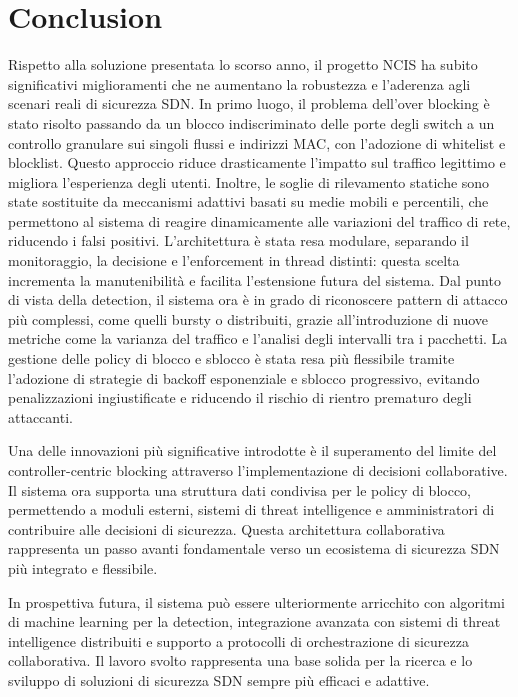 \chapter{Conclusion}
Rispetto alla soluzione presentata lo scorso anno, il progetto NCIS ha subito significativi miglioramenti che ne aumentano la robustezza e l'aderenza agli scenari reali di sicurezza SDN. In primo luogo, il problema dell'over blocking è stato risolto passando da un blocco indiscriminato delle porte degli switch a un controllo granulare sui singoli flussi e indirizzi MAC, con l'adozione di whitelist e blocklist. Questo approccio riduce drasticamente l'impatto sul traffico legittimo e migliora l'esperienza degli utenti. Inoltre, le soglie di rilevamento statiche sono state sostituite da meccanismi adattivi basati su medie mobili e percentili, che permettono al sistema di reagire dinamicamente alle variazioni del traffico di rete, riducendo i falsi positivi. L'architettura è stata resa modulare, separando il monitoraggio, la decisione e l'enforcement in thread distinti: questa scelta incrementa la manutenibilità e facilita l'estensione futura del sistema. Dal punto di vista della detection, il sistema ora è in grado di riconoscere pattern di attacco più complessi, come quelli bursty o distribuiti, grazie all'introduzione di nuove metriche come la varianza del traffico e l'analisi degli intervalli tra i pacchetti. La gestione delle policy di blocco e sblocco è stata resa più flessibile tramite l'adozione di strategie di backoff esponenziale e sblocco progressivo, evitando penalizzazioni ingiustificate e riducendo il rischio di rientro prematuro degli attaccanti.\par
Una delle innovazioni più significative introdotte è il superamento del limite del controller-centric blocking attraverso l'implementazione di decisioni collaborative. Il sistema ora supporta una struttura dati condivisa per le policy di blocco, permettendo a moduli esterni, sistemi di threat intelligence e amministratori di contribuire alle decisioni di sicurezza. Questa architettura collaborativa rappresenta un passo avanti fondamentale verso un ecosistema di sicurezza SDN più integrato e flessibile.\par
In prospettiva futura, il sistema può essere ulteriormente arricchito con algoritmi di machine learning per la detection, integrazione avanzata con sistemi di threat intelligence distribuiti e supporto a protocolli di orchestrazione di sicurezza collaborativa. Il lavoro svolto rappresenta una base solida per la ricerca e lo sviluppo di soluzioni di sicurezza SDN sempre più efficaci e adattive.

